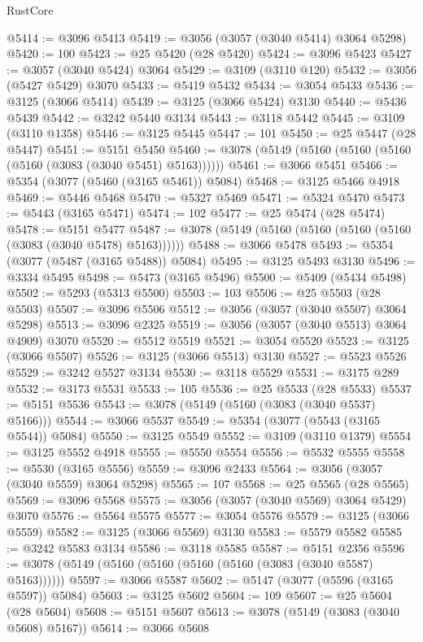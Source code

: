 \begin{lexlean}{RustCore}
\begin{coremodule}
@5414 := @3096 @5413
@5419 := @3056 (@3057 (@3040 @5414) @3064 @5298)
@5420 := 100
@5423 := @25 @5420 (@28 @5420)
@5424 := @3096 @5423
@5427 := @3057 (@3040 @5424) @3064
@5429 := @3109 (@3110 @120)
@5432 := @3056 (@5427 @5429) @3070
@5433 := @5419 @5432
@5434 := @3054 @5433
@5436 := @3125 (@3066 @5414)
@5439 := @3125 (@3066 @5424) @3130
@5440 := @5436 @5439
@5442 := @3242 @5440 @3134
@5443 := @3118 @5442
@5445 := @3109 (@3110 @1358)
@5446 := @3125 @5445
@5447 := 101
@5450 := @25 @5447 (@28 @5447)
@5451 := @5151 @5450
@5460 := @3078 (@5149 (@5160 (@5160 (@5160 (@5160 (@3083 (@3040 @5451) @5163))))))
@5461 := @3066 @5451
@5466 := @5354 (@3077 (@5460 (@3165 @5461)) @5084)
@5468 := @3125 @5466 @4918
@5469 := @5446 @5468
@5470 := @5327 @5469
@5471 := @5324 @5470
@5473 := @5443 (@3165 @5471)
@5474 := 102
@5477 := @25 @5474 (@28 @5474)
@5478 := @5151 @5477
@5487 := @3078 (@5149 (@5160 (@5160 (@5160 (@5160 (@3083 (@3040 @5478) @5163))))))
@5488 := @3066 @5478
@5493 := @5354 (@3077 (@5487 (@3165 @5488)) @5084)
@5495 := @3125 @5493 @3130
@5496 := @3334 @5495
@5498 := @5473 (@3165 @5496)
@5500 := @5409 (@5434 @5498)
@5502 := @5293 (@5313 @5500)
@5503 := 103
@5506 := @25 @5503 (@28 @5503)
@5507 := @3096 @5506
@5512 := @3056 (@3057 (@3040 @5507) @3064 @5298)
@5513 := @3096 @2325
@5519 := @3056 (@3057 (@3040 @5513) @3064 @4909) @3070
@5520 := @5512 @5519
@5521 := @3054 @5520
@5523 := @3125 (@3066 @5507)
@5526 := @3125 (@3066 @5513) @3130
@5527 := @5523 @5526
@5529 := @3242 @5527 @3134
@5530 := @3118 @5529
@5531 := @3175 @289
@5532 := @3173 @5531
@5533 := 105
@5536 := @25 @5533 (@28 @5533)
@5537 := @5151 @5536
@5543 := @3078 (@5149 (@5160 (@3083 (@3040 @5537) @5166)))
@5544 := @3066 @5537
@5549 := @5354 (@3077 (@5543 (@3165 @5544)) @5084)
@5550 := @3125 @5549
@5552 := @3109 (@3110 @1379)
@5554 := @3125 @5552 @4918
@5555 := @5550 @5554
@5556 := @5532 @5555
@5558 := @5530 (@3165 @5556)
@5559 := @3096 @2433
@5564 := @3056 (@3057 (@3040 @5559) @3064 @5298)
@5565 := 107
@5568 := @25 @5565 (@28 @5565)
@5569 := @3096 @5568
@5575 := @3056 (@3057 (@3040 @5569) @3064 @5429) @3070
@5576 := @5564 @5575
@5577 := @3054 @5576
@5579 := @3125 (@3066 @5559)
@5582 := @3125 (@3066 @5569) @3130
@5583 := @5579 @5582
@5585 := @3242 @5583 @3134
@5586 := @3118 @5585
@5587 := @5151 @2356
@5596 := @3078 (@5149 (@5160 (@5160 (@5160 (@5160 (@3083 (@3040 @5587) @5163))))))
@5597 := @3066 @5587
@5602 := @5147 (@3077 (@5596 (@3165 @5597)) @5084)
@5603 := @3125 @5602
@5604 := 109
@5607 := @25 @5604 (@28 @5604)
@5608 := @5151 @5607
@5613 := @3078 (@5149 (@3083 (@3040 @5608) @5167))
@5614 := @3066 @5608

\end{coremodule}
\end{lexlean}
